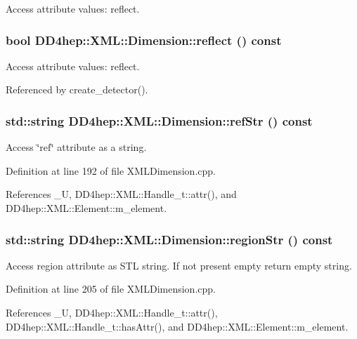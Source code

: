 Access attribute values: reflect. \hypertarget{struct_d_d4hep_1_1_x_m_l_1_1_dimension_ab9921b5efd0eae321bbf5f0c77261512}{
\subsubsection[{reflect}]{\setlength{\rightskip}{0pt plus 5cm}bool DD4hep::XML::Dimension::reflect () const}}
\label{struct_d_d4hep_1_1_x_m_l_1_1_dimension_ab9921b5efd0eae321bbf5f0c77261512}


Access attribute values: reflect. 

Referenced by create\_\-detector().\hypertarget{struct_d_d4hep_1_1_x_m_l_1_1_dimension_a6a57ea243030456557510f4044753662}{
\subsubsection[{refStr}]{\setlength{\rightskip}{0pt plus 5cm}std::string DD4hep::XML::Dimension::refStr () const}}
\label{struct_d_d4hep_1_1_x_m_l_1_1_dimension_a6a57ea243030456557510f4044753662}


Access \char`\"{}ref\char`\"{} attribute as a string. 

Definition at line 192 of file XMLDimension.cpp.

References \_\-U, DD4hep::XML::Handle\_\-t::attr(), and DD4hep::XML::Element::m\_\-element.\hypertarget{struct_d_d4hep_1_1_x_m_l_1_1_dimension_a388b5d319097db233341e251a78f7f3c}{
\subsubsection[{regionStr}]{\setlength{\rightskip}{0pt plus 5cm}std::string DD4hep::XML::Dimension::regionStr () const}}
\label{struct_d_d4hep_1_1_x_m_l_1_1_dimension_a388b5d319097db233341e251a78f7f3c}


Access region attribute as STL string. If not present empty return empty string. 

Definition at line 205 of file XMLDimension.cpp.

References \_\-U, DD4hep::XML::Handle\_\-t::attr(), DD4hep::XML::Handle\_\-t::hasAttr(), and DD4hep::XML::Element::m\_\-element.

